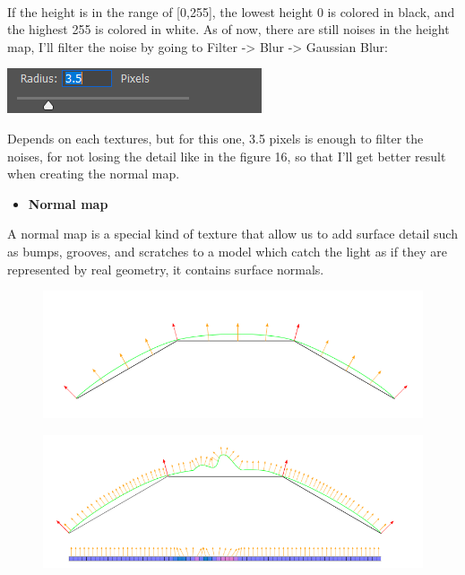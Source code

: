 \documentclass[a4paper, 13pt]{extarticle}
\begin{document}
  \\[0.2cm]
  If the height is in the range of [0,255], the lowest height 0 is colored in black, and the highest 255 is colored in white. As of now, there are still noises in the height map, I'll filter the noise by going to Filter -> Blur -> Gaussian Blur: \begin{minipage}{0.21\textwidth}
  	\includegraphics[width=\linewidth]{intructions/guassian_blur.png}
  \end{minipage}  Depends on each textures, but for this one, 3.5 pixels is enough to filter the noises, for not losing the detail like in the figure 16, so that I'll get better result when creating the normal map.  
\begin{itemize}
	\item \bfseries Normal map	 	
\end{itemize}
  A normal map is a special kind of texture that allow us to add surface detail such as bumps, grooves, and scratches to a model which catch the light as if they are represented by real geometry, it contains surface normals. 
  \begin{figure}[h]
  	\begin{minipage}{.45\textwidth}
  		\centering
  		\includegraphics[width=1\linewidth]{intructions/surface_normal.png}
  		\centering
  		\label{fig:test18}
  	\end{minipage}
  	\begin{minipage}{.4\textwidth}
  		\centering
  		\includegraphics[width=1.6\linewidth]{intructions/surface_normal_across.png}
  		\centering
  		\label{fig:test179}
  	\end{minipage}
  \end{figure}
\end{document}
